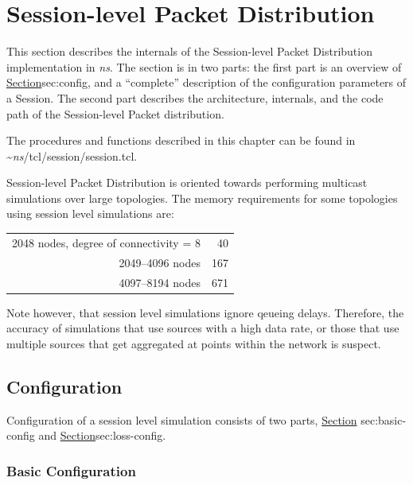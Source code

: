 \chapter{Session-level Packet Distribution}
\label{chap:session}

This section describes the internals of the Session-level Packet Distribution
implementation in \emph{ns}.
The section is in two parts:
the first part is an overview of 
\href{Session configuration}{Section}{sec:config},
and a ``complete'' description of the configuration parameters 
of a Session.
The second part describes the architecture, internals, and the code path
of the Session-level Packet distribution.

The procedures and functions described in this chapter can be found in
\textasciitilde\emph{ns}/{tcl/session/session.tcl}.

Session-level Packet Distribution is oriented towards
performing multicast simulations over large topologies.
The memory requirements for some topologies using
session level simulations are:

\begin{tabular}{r @{~~~$\approx$~} r@{\,MB}}
2048 nodes, degree of connectivity = 8 & 40 \\
2049--4096 nodes & 167 \\
4097--8194 nodes & 671 \\
\end{tabular}

Note however, that session level simulations ignore qeueing delays.
Therefore, the accuracy of
simulations that use sources with a high data rate,
or those that use multiple sources that get aggregated at points
within the network is suspect.

\section{Configuration}
\label{sec:config}

Configuration of a session level simulation consists of two parts,
\href{configuration of the session level details themselves}{Section}{%
        sec:basic-config}
and 
\href{adding loss and error models to the session level abstraction
to model specific behaviours}{Section}{sec:loss-config}.

\subsection{Basic Configuration}
\label{sec:basic-config}

